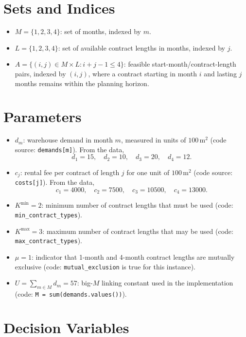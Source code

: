 \section*{Sets and Indices}

\begin{itemize}
    \item $M = \{1,2,3,4\}$: set of months, indexed by $m$.
    \item $L = \{1,2,3,4\}$: set of available contract lengths in months, indexed by $j$.
    \item $A = \{(i,j) \in M \times L : i+j-1 \le 4\}$: feasible start-month/contract-length pairs, indexed by $(i,j)$, where a contract starting in month $i$ and lasting $j$ months remains within the planning horizon.
\end{itemize}

\section*{Parameters}

\begin{itemize}
    \item $d_m$: warehouse demand in month $m$, measured in units of $100\,\text{m}^2$ (code source: \texttt{demands[m]}). From the data,
    \[
    d_1=15,\quad d_2=10,\quad d_3=20,\quad d_4=12.
    \]
    \item $c_j$: rental fee per contract of length $j$ for one unit of $100\,\text{m}^2$ (code source: \texttt{costs[j]}). From the data,
    \[
    c_1=4000,\quad c_2=7500,\quad c_3=10500,\quad c_4=13000.
    \]
    \item $K^{\min}=2$: minimum number of contract lengths that must be used (code: \texttt{min\_contract\_types}).
    \item $K^{\max}=3$: maximum number of contract lengths that may be used (code: \texttt{max\_contract\_types}).
    \item $\mu=1$: indicator that 1-month and 4-month contract lengths are mutually exclusive (code: \texttt{mutual\_exclusion} is true for this instance).
    \item $U=\sum_{m\in M} d_m = 57$: big-$M$ linking constant used in the implementation (code: \texttt{M = sum(demands.values())}).
\end{itemize}

\section*{Decision Variables}

